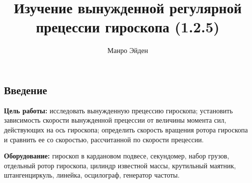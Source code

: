 \documentclass[a4paper, 12pt]{article}
\title{\textbf{Изучение вынужденной регулярной прецессии гироскопа (1.2.5)}}
\author{Манро Эйден}
\date{}
\begin{document}
\maketitle
	      	
    \begin{center}
    \section*{Введение}    
    \end{center}

    \noindent \textbf{Цель работы:} исследовать вынужденную прецессию гироскопа; установить зависимость скорости вынужденной прецессии от величины момента сил, действующих на ось гироскопа; определить скорость вращения ротора гироскопа и сравнить ее со скоростью, рассчитанной по скорости прецессии.

    \bigskip

    \noindent \textbf{Оборудование:} гироскоп в кардановом подвесе, секундомер, набор грузов, отдельный ротор гироскопа, цилиндр известной массы, крутильный маятник, штангенциркуль, линейка, осцилограф, генератор частоты.
    
\end{document}
